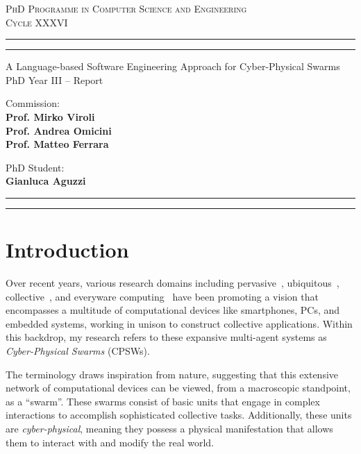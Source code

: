 \documentclass[11pt]{article}
\begin{document}
\sloppy
\begin{center}
	{{
		\Large{
			\textsc{PhD Programme in Computer Science and Engineering \\ 
			\vspace{4mm}
			Cycle XXXVI}
			}
	}} 
	\rule[0.1cm]{\textwidth}{0.1mm}
	\rule[0.4cm]{\textwidth}{0.6mm}
\end{center}

\begin{center}
	{\LARGE{A Language-based Software Engineering Approach for Cyber-Physical Swarms}} \\
	\vspace{4mm}
	{\large{PhD Year III -- Report}} 
	\vspace{4mm}
\end{center}
\vspace{8mm}
\par
\noindent
\begin{minipage}[t]{0.47\textwidth}

{\large{Commission: \\\bf
Prof. Mirko Viroli \\
Prof. Andrea Omicini \\
Prof. Matteo Ferrara} 
}
\end{minipage}
\hfill
\begin{minipage}[t]{0.47\textwidth}
	\raggedleft
	{
		\large{PhD Student: \\\bf Gianluca Aguzzi}
	}
\end{minipage}
\vspace{10mm}

{
	\raggedright
	\rule[0.1cm]{\textwidth}{0.6mm}
	\rule[0.5cm]{\textwidth}{0.1mm}
}

\newcommand{\rev}[1]{{
	#1
	}}
\section{Introduction}
Over recent years, various research domains including pervasive~\cite{pervasive}, ubiquitous~\cite{weiser1999computer}, collective~\cite{abowd2016beyond}, and everyware computing~\cite{greenfield2010everyware} have been promoting a vision 
 that encompasses a multitude of computational devices like smartphones, 
 PCs, and embedded systems, working in unison to construct collective applications. 
Within this backdrop, my research refers to these expansive multi-agent systems as \textit{Cyber-Physical Swarms} (CPSWs).

The terminology draws inspiration from nature, 
 suggesting that this extensive network of computational devices can be viewed, 
 from a macroscopic standpoint, as a ``swarm''. 
% 
These swarms consist of basic units that engage in complex interactions to accomplish sophisticated collective tasks. 
 Additionally, these units are \textit{cyber-physical}, 
 meaning they possess a physical manifestation that allows them to interact with and modify the real world.
\end{document}
